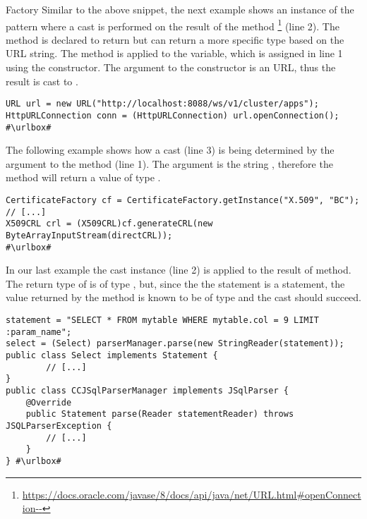 \begin{pattern}{Factory}
Similar to the above snippet,
the next example shows an instance of the \thisp{} pattern where a cast is performed on the result of the  method%
\footnote{\url{https://docs.oracle.com/javase/8/docs/api/java/net/URL.html\#openConnection--}}
(line 2).
The method is declared to return  but can return a more specific type based on the URL string.
The  method is applied to the  variable,
which is assigned in line 1 using the  constructor.
The argument to the constructor is an  URL,
thus the result is cast to .
\def\urlvar{http://bit.ly/apache_hadoop_2E6KY6T}
\begin{verbatim}
URL url = new URL("http://localhost:8088/ws/v1/cluster/apps");
HttpURLConnection conn = (HttpURLConnection) url.openConnection();
#\urlbox#
\end{verbatim}

The following example shows how a cast (line 3) is being determined by the argument to the  method (line 1).
The argument is the string ,
therefore the method  will return a value of type .
\def\urlvar{http://bit.ly/bcgit_bc_java_2TEVScM}
\begin{verbatim}
CertificateFactory cf = CertificateFactory.getInstance("X.509", "BC");
// [...]
X509CRL crl = (X509CRL)cf.generateCRL(new ByteArrayInputStream(directCRL));
#\urlbox#
\end{verbatim}

In our last example the cast instance (line 2) is applied to the result of  method.
The return type of  is of type , but,
since the the statement is a  statement,
the value returned by the  method is known to be of type 
and the cast should succeed.
\def\urlvar{http://bit.ly/JSQLParser_JSqlParser_2TecMyB}
\begin{verbatim}
statement = "SELECT * FROM mytable WHERE mytable.col = 9 LIMIT :param_name";
select = (Select) parserManager.parse(new StringReader(statement));
public class Select implements Statement {
        // [...]
}
public class CCJSqlParserManager implements JSqlParser {
    @Override
    public Statement parse(Reader statementReader) throws JSQLParserException {
        // [...]
    }
} #\urlbox#
\end{verbatim}


\end{pattern}
